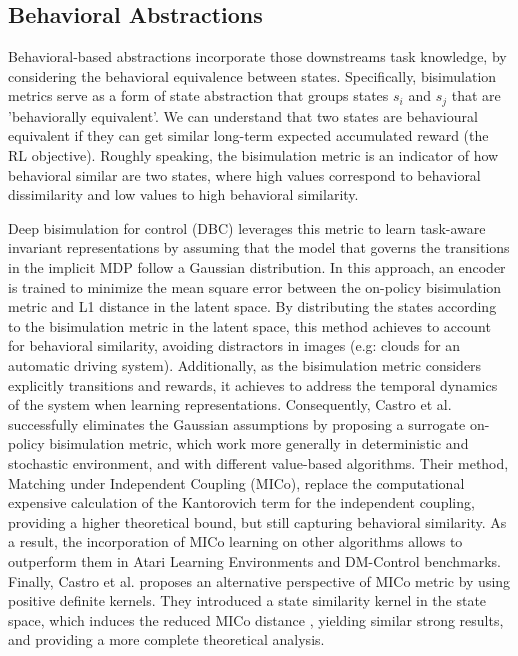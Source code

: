 
\subsection{Behavioral Abstractions}

Behavioral-based abstractions incorporate those downstreams task knowledge, by considering the behavioral equivalence between states. Specifically, bisimulation metrics serve as a form of state abstraction that groups states \(s_i\) and \(s_j\) that are 'behaviorally equivalent'. We can understand that two states are behavioural equivalent if they can get similar long-term expected accumulated reward (the RL objective). Roughly speaking, the bisimulation metric is an indicator of how behavioral similar are two states, where high values correspond to behavioral dissimilarity and low values to high behavioral similarity.  

Deep bisimulation for control (DBC) \cite{zhang2020learning} leverages this metric to learn task-aware invariant representations by assuming that the model that governs the transitions in the implicit MDP follow a Gaussian distribution. In this approach, an encoder is trained to minimize the mean square error between the on-policy bisimulation metric and L1 distance in the latent space. By distributing the states according to the bisimulation metric in the latent space, this method achieves to account for behavioral similarity, avoiding distractors in images (e.g: clouds for an automatic driving system). Additionally, as the bisimulation metric considers explicitly transitions and rewards, it achieves to address the temporal dynamics of the system when learning representations. Consequently, Castro et al. \cite{castro2021mico} successfully eliminates the Gaussian assumptions by proposing a surrogate on-policy bisimulation metric, which work more generally in deterministic and stochastic environment, and with different value-based algorithms. Their method, Matching under Independent Coupling (MICo), replace the computational expensive calculation of the Kantorovich term for the independent coupling, providing a higher theoretical bound, but still capturing behavioral similarity. As a result, the incorporation of MICo learning on other algorithms allows to outperform them in Atari Learning Environments and DM-Control benchmarks. Finally, Castro et al. \cite{castro2023kernel} proposes an alternative perspective of MICo metric by using positive definite kernels. They introduced a state similarity kernel in the state space, which induces the reduced MICo distance \cite{castro2021mico}, yielding similar strong results, and providing a more complete theoretical analysis.


